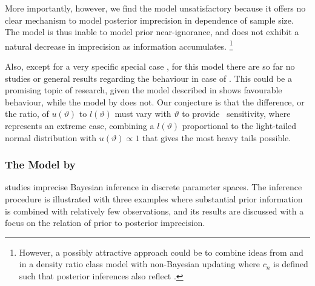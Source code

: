 More importantly, however, we find the model unsatisfactory because it offers no clear mechanism %
to model posterior imprecision in dependence of sample size. %
The model is thus inable to model prior near-ignorance, and does not exhibit
a natural decrease in imprecision as information accumulates.%
\footnote{\label{foot:coolenplusrinderknecht}However, a possibly attractive approach could be to
combine ideas from \textcite{1993:coolen} and \textcite{2011:rinderknecht:diss}
in a density ratio class model with non-Bayesian updating
where $c_n$ is defined such that posterior inferences also reflect \pdc.}

Also, except for a very specific special case \parencite[\S 4.3, as discussed above]{1991:pericchi},
for this model there are so far no studies or general results regarding the behaviour in case of \pdc.
This could be a promising topic of research,
given the model described in \textcite[\S 4.3]{1991:pericchi} shows favourable behaviour,
while the model by \textcite{1993:coolen} does not.
Our conjecture is that the difference, or the ratio, of $u(\vartheta)$ to $l(\vartheta)$
must vary with $\vartheta$ to provide \pdc\ sensitivity,
where \textcite[\S 4.3]{1991:pericchi} represents an extreme case,
combining a $l(\vartheta)$ proportional to the light-tailed normal distribution %
with $u(\vartheta) \propto 1$ that gives the most heavy tails possible.


\subsubsection{The Model by \texorpdfstring{\textcite{2005:whitcomb}}{Whitcomb (2005)}}
\label{sec:alternatives:whitcomb}

\textcite{2005:whitcomb} studies imprecise Bayesian inference in discrete parameter spaces.
The inference procedure is illustrated with three examples
where substantial prior information is combined with relatively few observations,
and its results are discussed with a focus on the relation of prior to posterior imprecision.

